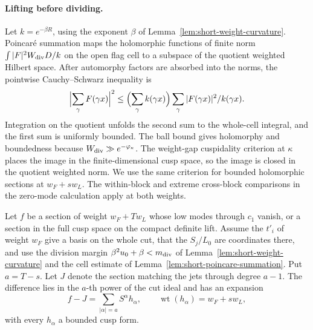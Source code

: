 \paragraph{Lifting before dividing.}
Let \(k=e^{-\beta R}\), using the exponent \(\beta\) of Lemma~\ref{lem:short-weight-curvature}.
Poincar\'e summation maps the holomorphic functions
of finite norm
\(\int |F|^2 W_{\rm div}D/k\) on the open flag cell to
a subspace of the quotient weighted Hilbert space.
After automorphy factors are absorbed into the norms, the
pointwise Cauchy--Schwarz inequality is
\[
 \Bigl|\sum_\gamma F(\gamma x)\Bigr|^2
 \le \Bigl(\sum_\gamma k(\gamma x)\Bigr)
       \sum_\gamma |F(\gamma x)|^2/k(\gamma x).
\]
Integration on the quotient unfolds the second sum to the
whole-cell integral, and the first sum is uniformly bounded.
The ball bound gives holomorphy and boundedness because
\(W_{\rm div}\gg e^{-\varphi_\kappa}\). The weight-gap
cuspidality criterion at \(\kappa\) places the image in
the finite-dimensional cusp space, so the image is closed
in the quotient weighted norm. We use the same criterion
for bounded holomorphic sections at \(w_F+s w_L\).
The within-block and extreme cross-block comparisons
in the zero-mode calculation apply at both weights.

\begin{proposition}
\label{prop:lift-and-divide-at-slice}
Let \(f\) be a section of weight \(w_F+Tw_L\) whose low modes
through \(c_1\) vanish, or a section in the full cusp space on the
compact definite lift. Assume the \(t'_i\) of weight \(w_F\) give
a basis on the whole cut, that the \(S_j/L_0\) are coordinates
there, and use the division margin
\(\beta^2u_0+\beta<m_{\rm div}\) of
Lemma~\ref{lem:short-weight-curvature} and the cell estimate of
Lemma~\ref{lem:short-poincare-summation}. Put \(a=T-s\).
Let \(J\) denote the section matching the jets through degree \(a-1\). The difference lies in the \(a\)-th power of the cut ideal and has an expansion
\[
 f-J=\sum_{|\alpha|=a}S^\alpha h_\alpha,\qquad \operatorname{wt}(h_\alpha)=w_F+s w_L,
\]
with every \(h_\alpha\) a bounded cusp form.
\end{proposition}

